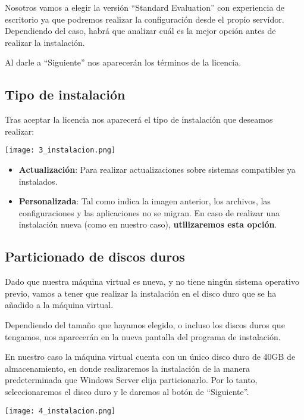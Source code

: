 Nosotros vamos a elegir la versión “Standard Evaluation” con experiencia de escritorio ya que podremos realizar la configuración desde el propio servidor. Dependiendo del caso, habrá que analizar cuál es la mejor opción antes de realizar la instalación.

Al darle a “Siguiente” nos aparecerán los términos de la licencia.

\subsection{Tipo de instalación}
Tras aceptar la licencia nos aparecerá el tipo de instalación que deseamos realizar:
\begin{center}
    \vspace{-10pt}
    \texttt{[image: 3\_instalacion.png]}
    \vspace{-10pt}
\end{center}

\begin{itemize}
    \item \textbf{Actualización}: Para realizar actualizaciones sobre sistemas compatibles ya instalados.
    \item \textbf{Personalizada}: Tal como indica la imagen anterior, los archivos, las configuraciones y las aplicaciones no se migran. En caso de realizar una instalación nueva (como en nuestro caso), \textbf{utilizaremos esta opción}.
\end{itemize}

\subsection{Particionado de discos duros}
Dado que nuestra máquina virtual es nueva, y no tiene ningún sistema operativo previo, vamos a tener que realizar la instalación en el disco duro que se ha añadido a la máquina virtual.

Dependiendo del tamaño que hayamos elegido, o incluso los discos duros que tengamos, nos aparecerán en la nueva pantalla del programa de instalación.

{
    \begin{minipage}{0.6\linewidth}
        \setlength{\parskip}{1.2em}
        En nuestro caso la máquina virtual cuenta con un único disco duro de 40GB de almacenamiento, en donde realizaremos la instalación de la manera predeterminada que Windows Server elija particionarlo. Por lo tanto, seleccionaremos el disco duro y le daremos al botón de “Siguiente”.
    \end{minipage}
    \hfill
    \begin{minipage}{0.36\linewidth}
        \vspace{-11pt}
        \texttt{[image: 4\_instalacion.png]}
    \end{minipage}
}



